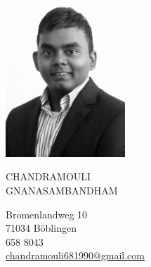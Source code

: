 \documentclass{mycv}
\begin{document}
\sloppy %
\color{templateColor1}
\AddToShipoutPicture{\BackgroundPic}

\normalfont
\begin{minipage}[c]{0.3\textwidth}
	\centering
	\includegraphics[width=4.5cm,height=6cm]{img/CV_Photo.jpg}
\end{minipage}
\begin{minipage}[]{0.7\textwidth}

  \vspace{5mm}
	{\Huge CHANDRAMOULI}\\

	{\Huge GNANASAMBANDHAM}
	\vspace{2mm}

	\vspace{2mm}

  Bromenlandweg 10\\
	71034 B{\"o}blingen\\

	 658 8043\\
	\mailIcon \href{mailto:chandramouli681990@gmail.com}{chandramouli681990@gmail.com}
  
  \vspace{13mm}
\end{minipage}
\end{document}
